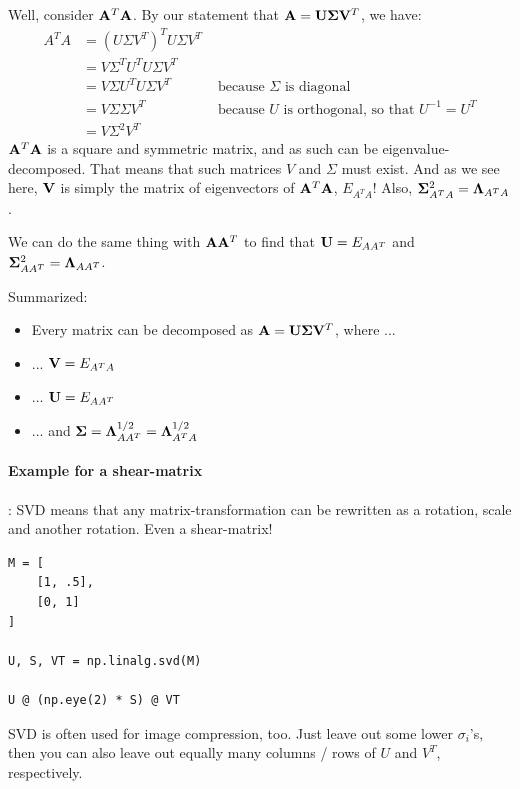 Well, consider $\mathbf{A}^T\mathbf{A}$.
By our statement that $\mathbf{A} = \mathbf{U} \mathbf{\Sigma} \mathbf{V}^T$, we have:
\begin{equation}
    \begin{aligned}
        A^TA    &= ( U \Sigma V^T )^T U \Sigma V^T & \\
                &= V \Sigma^T U^T U \Sigma V^T & \\
                &= V \Sigma U^T U \Sigma V^T & \text { because $\Sigma$ is diagonal} \\
                &= V \Sigma \Sigma V^T & \text{ because $U$ is orthogonal, so that $U^{-1} = U^T$} \\
                &= V \Sigma^2 V^T
    \end{aligned}
\end{equation}
$\mathbf{A}^T\mathbf{A}$ is a square and symmetric matrix, and as such can be eigenvalue-decomposed. That means that such matrices $V$ and $\Sigma$ must exist. And as we see here, $\mathbf{V}$ is simply the matrix of eigenvectors of $\mathbf{A}^T\mathbf{A}$, $E_{A^TA}$!
Also, $\mathbf{\Sigma}^2_{A^TA} = \mathbf{\Lambda}_{A^TA}$.

We can do the same thing with $\mathbf{A}\mathbf{A}^T$ to find that $\mathbf{U} = E_{AA^T}$ and $\mathbf{\Sigma}^2_{AA^T} = \mathbf{\Lambda}_{AA^T}$.

Summarized:
\begin{itemize}
    \item Every matrix can be decomposed as $\mathbf{A} = \mathbf{U} \mathbf{\Sigma} \mathbf{V}^T$, where ...
    \item ... $\mathbf{V} = E_{A^TA}$
    \item ... $\mathbf{U} = E_{AA^T}$
    \item ... and $\mathbf{\Sigma} = \mathbf{\Lambda}^{1/2}_{AA^T} = \mathbf{\Lambda}^{1/2}_{A^TA}$
\end{itemize}



\paragraph{Example for a shear-matrix}: SVD means that any matrix-transformation can be rewritten as a rotation, scale and another rotation. Even a shear-matrix!
\begin{lstlisting}
M = [
    [1, .5],
    [0, 1]
]

U, S, VT = np.linalg.svd(M)

U @ (np.eye(2) * S) @ VT
\end{lstlisting}
SVD is often used for image compression, too. Just leave out some lower $\sigma_i$'s, then you can also leave out equally many columns / rows of $U$ and $V^T$, respectively.


